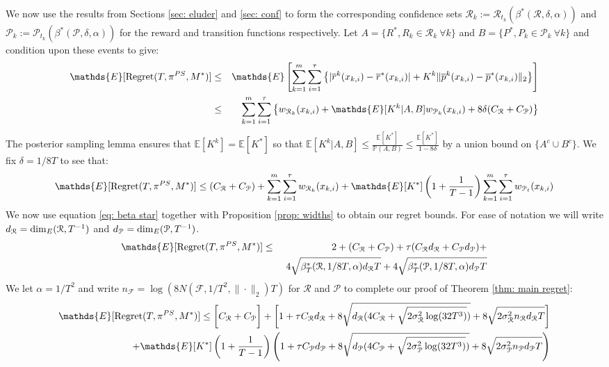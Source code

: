\documentclass{article}
\newcommand{\Exp}{\mathds{E}}
\newcommand{\Prob}{\mathds{P}}
\newcommand{\Pc}{\mathcal{P}}
\newcommand{\Fc}{\mathcal{F}}
\newcommand{\Rc}{\mathcal{R}}
\begin{document}
We now use the results from Sections \ref{sec: eluder} and \ref{sec: conf} to form the corresponding confidence sets $\Rc_k := \Rc_{t_k}(\beta^*(\Rc,\delta,\alpha))$ and $\Pc_k := \Pc_{t_k}(\beta^*(\Pc,\delta,\alpha))$ for the reward and transition functions respectively.
Let $A = \{R^*, R_k \in \Rc_k \ \forall k \}$ and $B = \{P^*,P_k \in \Pc_k \ \forall k \}$ and condition upon these events to give:
\begin{eqnarray}
\label{eq: reg widths}
	\Exp[{\rm Regret}(T,\pi^{PS},M^*)] &\le&
	\Exp\left[ \sum_{k=1}^m \sum_{i=1}^\tau
		\left\{ | \overline{r}^k(x_{k,i}) - \overline{r}^*(x_{k,i})|
		+ K^k \|\overline{p}^k(x_{k,i}) - \overline{p}^*(x_{k,i}) \|_2 \right\}\right] \nonumber \\
	&\le& \sum_{k=1}^m \sum_{i=1}^\tau \left\{ w_{\Rc_k}(x_{k,i}) +
		 \Exp[K^k|A,B] w_{\Pc_k}(x_{k,i}) + 8 \delta (C_\Rc + C_\Pc) \right\}
\end{eqnarray}
The posterior sampling lemma ensures that $\Exp[K^k] = \Exp[K^*]$ so that
$\Exp[K^k|A,B] \le \frac{\Exp[K^*]}{\Prob(A,B)} \le \frac{\Exp[K^*]}{1-8\delta}$
by a union bound on $\{A^c \cup B^c\}$.
We fix $\delta = 1/8T$ to see that:
$$ \Exp[{\rm Regret}(T,\pi^{PS},M^*)] \le (C_\Rc + C_\Pc) +
	\sum_{k=1}^m \sum_{i=1}^\tau w_{\Rc_k}(x_{k,i})
	+ \Exp[K^*] \left(1+\frac{1}{T-1} \right)\sum_{k=1}^m \sum_{i=1}^\tau w_{\Pc_t}(x_{k,i})  $$
We now use equation \eqref{eq: beta star} together with Proposition \ref{prop: widths} to obtain our regret bounds.
For ease of notation we will write $d_\Rc = {\rm dim}_E(\Rc,T^{-1})$ and $d_\Pc = {\rm dim}_E(\Pc,T^{-1})$.
\begin{eqnarray}
	\Exp[{\rm Regret}(T,\pi^{PS},M^*)] &\le&
	2 + (C_\Rc + C_\Pc) + \tau(C_\Rc d_\Rc+ C_\Pc d_\Pc) + \nonumber \\
	&& \  4 \sqrt{\beta_T^*(\Rc,1/8T,\alpha) d_\Rc T} + 4 \sqrt{\beta_T^*(\Pc,1/8T,\alpha) d_\Pc T}
\end{eqnarray}
We let $\alpha = 1/T^2$ and write $n_\Fc = \log(8 N(\Fc,1/T^2,\|\cdot\|_2)T)$ for $\Rc$ and $\Pc$ to complete our proof of Theorem \ref{thm: main regret}:
\begin{eqnarray}
	\Exp[{\rm Regret}(T,\pi^{PS},M^*)] \le
	\bigg[ C_\Rc + C_\Pc \bigg] +
	\bigg[ 1 + \tau C_\Rc d_\Rc + 8\sqrt{d_\Rc(4C_\Rc + \sqrt{2\sigma_\Rc^2 \log(32T^3)})}
	+ 8\sqrt{2 \sigma_\Rc^2 n_\Rc d_\Rc T} \bigg] \nonumber \\
	+ \Exp[K^*]\left(1+\frac{1}{T-1}\right)\left( 1 + \tau C_\Pc d_\Pc + 8\sqrt{d_\Pc(4C_\Pc + \sqrt{2\sigma_\Pc^2 \log(32T^3)})}
	+ 8\sqrt{2 \sigma_\Pc^2 n_\Pc d_\Pc T} \right) \nonumber
\end{eqnarray}
\end{document}
